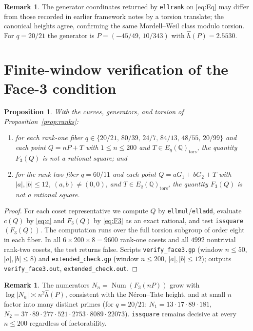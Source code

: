 \documentclass[11pt,reqno]{amsart}
\theoremstyle{plain}
\newtheorem{proposition}[theorem]{Proposition}
\theoremstyle{definition}
\newtheorem{remark}[theorem]{Remark}
\newcommand{\Q}{\mathbb{Q}}
\newcommand{\hath}{\hat{h}}
\DeclareMathOperator{\Num}{Num}
\begin{document}
\begin{remark}
The generator coordinates returned by \texttt{ellrank} on \eqref{eq:Eq} may
differ from those recorded in earlier framework notes by a torsion translate;
the canonical heights agree, confirming the same Mordell--Weil class modulo
torsion. For $q=20/21$ the generator is $P=(-45/49,\,10/343)$ with
$\hath(P)=2.5530$.
\end{remark}

\section{Finite-window verification of the Face-3 condition}

\begin{proposition}\label{prop:window}
With the curves, generators, and torsion of Proposition~\textup{\ref{prop:ranks}}:
\begin{enumerate}
\item[(i)] for each rank-one fiber
$q\in\{20/21,\,80/39,\,24/7,\,84/13,\,48/55,\,20/99\}$ and each point
$Q=nP+T$ with $1\le n\le 200$ and $T\in E_q(\Q)_{\mathrm{tors}}$, the quantity
$F_3(Q)$ is not a rational square; and
\item[(ii)] for the rank-two fiber $q=60/11$ and each point
$Q=aG_1+bG_2+T$ with $|a|,|b|\le 12$, $(a,b)\neq(0,0)$, and
$T\in E_q(\Q)_{\mathrm{tors}}$, the quantity $F_3(Q)$ is not a rational square.
\end{enumerate}
\end{proposition}

\begin{proof}
For each coset representative we compute $Q$ by \texttt{ellmul}/\texttt{elladd},
evaluate $c(Q)$ by \eqref{eq:c} and $F_3(Q)$ by \eqref{eq:F3} as an exact
rational, and test \texttt{issquare}$(F_3(Q))$. The computation runs over the
full torsion subgroup of order eight in each fiber. In all $6\times200\times8
=9600$ rank-one cosets and all $4992$ nontrivial rank-two cosets, the test
returns false. Scripts \texttt{verify\_face3.gp} (window $n\le50$,
$|a|,|b|\le8$) and \texttt{extended\_check.gp} (window $n\le200$,
$|a|,|b|\le12$); outputs \texttt{verify\_face3.out},
\texttt{extended\_check.out}.
\end{proof}

\begin{remark}\label{rem:growth}
The numerators $N_n=\Num(F_3(nP))$ grow with $\log|N_n|\asymp n^2\hath(P)$,
consistent with the N\'eron--Tate height, and at small $n$ factor into many
distinct primes (for $q=20/21$: $N_1=13\cdot17\cdot89\cdot181$,
$N_2=37\cdot89\cdot277\cdot521\cdot2753\cdot8089\cdot22073$). \texttt{issquare}
remains decisive at every $n\le200$ regardless of factorability.
\end{remark}
\end{document}
